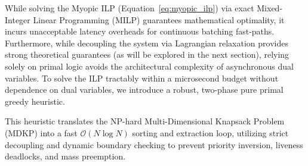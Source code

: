 \documentclass[11pt]{article}
\begin{document}
While solving the Myopic ILP (Equation~\ref{eq:myopic_ilp}) via exact Mixed-Integer Linear Programming (MILP) guarantees mathematical optimality, it incurs unacceptable latency overheads for continuous batching fast-paths. 
Furthermore, while decoupling the system via Lagrangian relaxation provides strong theoretical guarantees (as will be explored in the next section), relying solely on primal logic avoids the architectural complexity of asynchronous dual variables.
To solve the ILP tractably within a microsecond budget without dependence on dual variables, we introduce a robust, two-phase pure primal greedy heuristic. 

This heuristic translates the NP-hard Multi-Dimensional Knapsack Problem (MDKP) into a fast $\mathcal{O}(N \log N)$ sorting and extraction loop, utilizing strict decoupling and dynamic boundary checking to prevent priority inversion, liveness deadlocks, and mass preemption.
\end{document}
